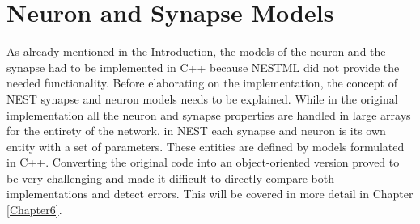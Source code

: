 \section{Neuron and Synapse Models} \label{sec:neuron_synapse_models}
As already mentioned in the Introduction, the models of the neuron and the synapse had to be implemented in C++ because NESTML did not provide the needed functionality. Before elaborating on the implementation, the concept of NEST synapse and neuron models needs to be explained. While in the original implementation all the neuron and synapse properties are handled in large arrays for the entirety of the network, in NEST each synapse and neuron is its own entity with a set of parameters. These entities are defined by models formulated in C++. Converting the original code into an object-oriented version proved to be very challenging and made it difficult to directly compare both implementations and detect errors. This will be covered in more detail in Chapter \ref{Chapter6}.


